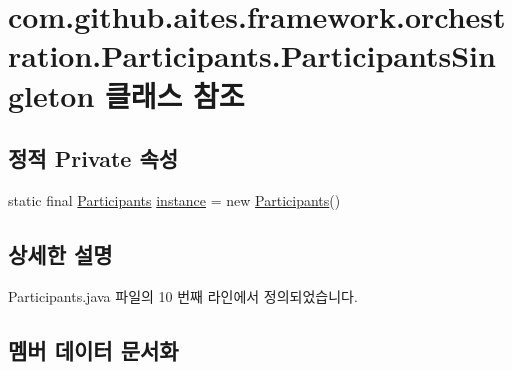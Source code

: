 \hypertarget{classcom_1_1github_1_1aites_1_1framework_1_1orchestration_1_1_participants_1_1_participants_singleton}{}\section{com.\+github.\+aites.\+framework.\+orchestration.\+Participants.\+Participants\+Singleton 클래스 참조}
\label{classcom_1_1github_1_1aites_1_1framework_1_1orchestration_1_1_participants_1_1_participants_singleton}
\subsection*{정적 Private 속성}
\begin{DoxyCompactItemize}
\item 
static final \mbox{\hyperlink{classcom_1_1github_1_1aites_1_1framework_1_1orchestration_1_1_participants}{Participants}} \mbox{\hyperlink{classcom_1_1github_1_1aites_1_1framework_1_1orchestration_1_1_participants_1_1_participants_singleton_ac04f38a0188a8df9ea8e5e5303f3d4d9}{instance}} = new \mbox{\hyperlink{classcom_1_1github_1_1aites_1_1framework_1_1orchestration_1_1_participants}{Participants}}()
\end{DoxyCompactItemize}


\subsection{상세한 설명}


Participants.\+java 파일의 10 번째 라인에서 정의되었습니다.



\subsection{멤버 데이터 문서화}
\mbox{\label{classcom_1_1github_1_1aites_1_1framework_1_1orchestration_1_1_participants_1_1_participants_singleton_ac04f38a0188a8df9ea8e5e5303f3d4d9}} 
